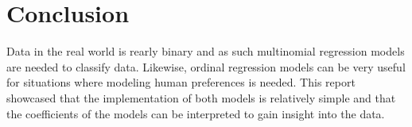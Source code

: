 \documentclass[9pt]{IEEEtran}
\begin{document}
\section{Conclusion}
Data in the real world is rearly binary and as such multinomial regression models are needed to classify data.
Likewise, ordinal regression models can be very useful for situations where modeling human preferences is needed.
This report showcased that the implementation of both models is relatively simple and that the coefficients of the models can be interpreted to gain insight into the data.



\end{document}
